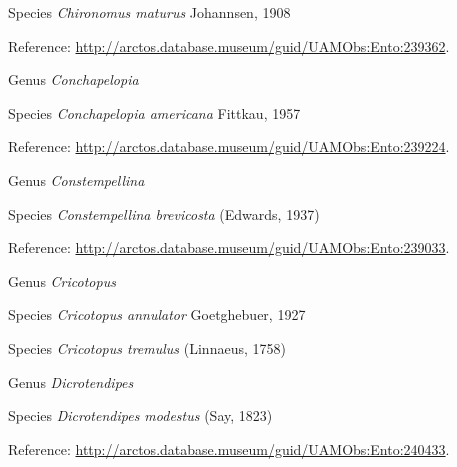 \documentclass[9pt, article]{memoir}
\begin{document}
\begin{multicols}{2}
\vspace{6pt}\noindent\hspace{36pt}Species \textit{Chironomus maturus} Johannsen, 1908


\vspace{6pt}Reference: 
\url{http://arctos.database.museum/guid/UAMObs:Ento:239362}.

\vspace{6pt}\noindent\hspace{30pt}Genus \textit{Conchapelopia}


\vspace{6pt}\noindent\hspace{36pt}Species \textit{Conchapelopia americana} Fittkau, 1957


\vspace{6pt}Reference: 
\url{http://arctos.database.museum/guid/UAMObs:Ento:239224}.

\vspace{6pt}\noindent\hspace{30pt}Genus \textit{Constempellina}


\vspace{6pt}\noindent\hspace{36pt}Species \textit{Constempellina brevicosta} (Edwards, 1937)


\vspace{6pt}Reference: 
\url{http://arctos.database.museum/guid/UAMObs:Ento:239033}.

\vspace{6pt}\noindent\hspace{30pt}Genus \textit{Cricotopus}


\vspace{6pt}\noindent\hspace{36pt}Species \textit{Cricotopus annulator} Goetghebuer, 1927


\vspace{6pt}\noindent\hspace{36pt}Species \textit{Cricotopus tremulus} (Linnaeus, 1758)


\vspace{6pt}\noindent\hspace{30pt}Genus \textit{Dicrotendipes}


\vspace{6pt}\noindent\hspace{36pt}Species \textit{Dicrotendipes modestus} (Say, 1823)


\vspace{6pt}Reference: 
\url{http://arctos.database.museum/guid/UAMObs:Ento:240433}.


\end{multicols}
\end{document}
